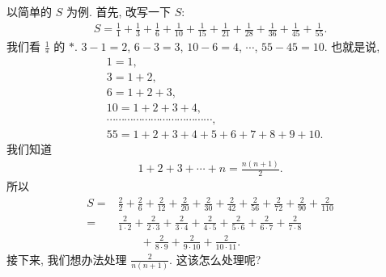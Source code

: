 以简单的 $S$ 为例. 首先, 改写一下 $S$:
\begin{align*}
    S = \frac{1}{1} + \frac{1}{3} + \frac{1}{6} + \frac{1}{10} + \frac{1}{15} + \frac{1}{21} + \frac{1}{28} + \frac{1}{36} + \frac{1}{45} + \frac{1}{55}.
\end{align*}
我们看 $\frac{1}{\ast}$ 的 $\ast$. $3 - 1 = 2$, $6 - 3 = 3$, $10 - 6 = 4$, $\cdots$, $55 - 45 = 10$. 也就是说,
\begin{align*}
     & 1 = 1,                                       \\
     & 3 = 1 + 2,                                   \\
     & 6 = 1 + 2 + 3,                               \\
     & 10 = 1 + 2 + 3 + 4,                          \\
     & \cdots \cdots \cdots \cdots \cdots \cdots
    \cdots \cdots \cdots \cdots \cdots \cdots,      \\
     & 55 = 1 + 2 + 3 + 4 + 5 + 6 + 7 + 8 + 9 + 10.
\end{align*}
我们知道
\begin{align*}
    1 + 2 + 3 + \cdots + n = \frac{n(n+1)}{2}.
\end{align*}
所以
\begin{align*}
    S
    = {} & \frac{2}{2} + \frac{2}{6} + \frac{2}{12} + \frac{2}{20} + \frac{2}{30}
    + \frac{2}{42} + \frac{2}{56} + \frac{2}{72} + \frac{2}{90} + \frac{2}{110}   \\
    = {} & \frac{2}{1 \cdot 2} + \frac{2}{2 \cdot 3} + \frac{2}{3 \cdot 4}
    + \frac{2}{4 \cdot 5} + \frac{2}{5 \cdot 6} + \frac{2}{6 \cdot 7}
    + \frac{2}{7 \cdot 8}                                                         \\
         & \qquad + \frac{2}{8 \cdot 9} + \frac{2}{9 \cdot 10}
    + \frac{2}{10 \cdot 11}.
\end{align*}
接下来, 我们想办法处理 $\frac{2}{n(n+1)}$. 这该怎么处理呢?

